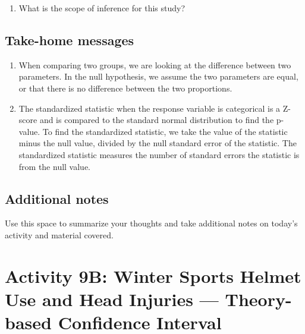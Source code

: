 \documentclass[
]{report}
\providecommand{\tightlist}{%
  \setlength{\itemsep}{0pt}\setlength{\parskip}{0pt}}
\begin{document}
\vspace{0.8in}

\begin{enumerate}
\def\labelenumi{\arabic{enumi}.}
\setcounter{enumi}{12}
\tightlist
\item
  What is the scope of inference for this study?
\end{enumerate}

\newpage

\newpage

\hypertarget{take-home-messages-15}{%
\subsection{Take-home messages}\label{take-home-messages-15}}

\begin{enumerate}
\def\labelenumi{\arabic{enumi}.}
\item
  When comparing two groups, we are looking at the difference between two parameters. In the null hypothesis, we assume the two parameters are equal, or that there is no difference between the two proportions.
\item
  The standardized statistic when the response variable is categorical is a Z-score and is compared to the standard normal distribution to find the p-value. To find the standardized statistic, we take the value of the statistic minus the null value, divided by the null standard error of the statistic. The standardized statistic measures the number of standard errors the statistic is from the null value.
\end{enumerate}

\hypertarget{additional-notes-14}{%
\subsection{Additional notes}\label{additional-notes-14}}

Use this space to summarize your thoughts and take additional notes on today's activity and material covered.

\newpage

\hypertarget{activity-9b-winter-sports-helmet-use-and-head-injuries-theory-based-confidence-interval}{%
\section{Activity 9B: Winter Sports Helmet Use and Head Injuries --- Theory-based Confidence Interval}\label{activity-9b-winter-sports-helmet-use-and-head-injuries-theory-based-confidence-interval}}
\end{document}
